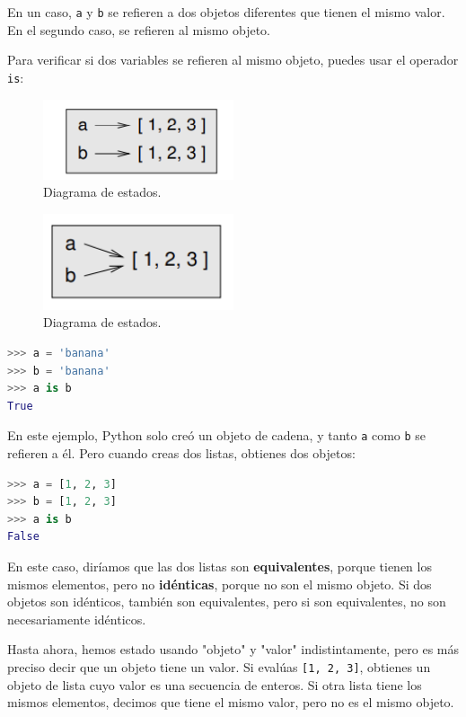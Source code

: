 En un caso, \texttt{a} y \texttt{b} se refieren a dos objetos diferentes que tienen el mismo valor. En el segundo caso, se refieren al mismo objeto.

Para verificar si dos variables se refieren al mismo objeto, puedes usar el operador \texttt{is}:
\begin{figure}[h]
        \centering
        \includegraphics[width=0.5\textwidth]{./images/chapter_10_3.png}
        \caption{Diagrama de estados.}
        \label{fig:10_3}
        \end{figure}

\begin{figure}[h]
        \centering
        \includegraphics[width=0.5\textwidth]{./images/chapter_10_4.png}
        \caption{Diagrama de estados.}
        \label{fig:10_4}
        \end{figure}

\begin{lstlisting}[language=Python]
>>> a = 'banana' 
>>> b = 'banana' 
>>> a is b 
True
\end{lstlisting}

En este ejemplo, Python solo creó un objeto de cadena, y tanto \texttt{a} como \texttt{b} se refieren a él. Pero cuando creas dos listas, obtienes dos objetos:

\begin{lstlisting}[language=Python]
>>> a = [1, 2, 3] 
>>> b = [1, 2, 3] 
>>> a is b 
False
\end{lstlisting}

En este caso, diríamos que las dos listas son \textbf{equivalentes}, porque tienen los mismos elementos, pero no \textbf{idénticas}, porque no son el mismo objeto. Si dos objetos son idénticos, también son equivalentes, pero si son equivalentes, no son necesariamente idénticos.

Hasta ahora, hemos estado usando "objeto" y "valor" indistintamente, pero es más preciso decir que un objeto tiene un valor. Si evalúas \texttt{[1, 2, 3]}, obtienes un objeto de lista cuyo valor es una secuencia de enteros. Si otra lista tiene los mismos elementos, decimos que tiene el mismo valor, pero no es el mismo objeto.

